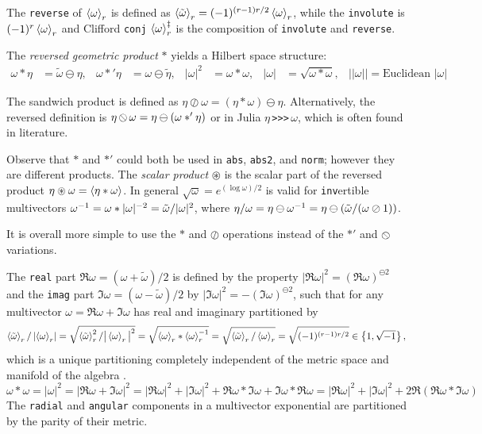 \documentclass{juliacon}
\DeclareMathOperator*{\obackslash}{\text{\reflectbox{$\oslash$}}}
\begin{document}
\begin{definition}
	The \verb`reverse` of $\left\langle \omega \right\rangle_r$ is defined as $\left\langle \tilde\omega \right\rangle_r = (-1)^{(r-1)r/2}\left\langle \omega \right\rangle_r$, while the \verb`involute` is $(-1)^r\left\langle \omega \right\rangle_r$ and Clifford \verb`conj`  $\left\langle \omega \right\rangle_r^\ddagger$ is the composition of \verb`involute` and \verb`reverse`.
\end{definition}

\begin{definition}
	The \textit{reversed geometric product} $\ast$ yields a Hilbert space structure:
	\begin{align*}
		\omega\ast\eta &= \tilde\omega\ominus\eta, & \omega\ast'\eta &= \omega\ominus\tilde\eta, & |\omega|^2 &= \omega\ast\omega, & |\omega| &= \sqrt{\omega\ast\omega}, & ||\omega|| = \text{Euclidean }|\omega|
	\end{align*}
\end{definition}
\begin{definition}
	The sandwich product is defined as $\eta\oslash\omega = (\eta\ast\omega)\ominus\eta$. Alternatively, the reversed definition is $\eta\obackslash\omega = \eta\ominus(\omega\ast'\eta)$ or in Julia $\eta\,$\verb`>>>`$\,\omega$, which is often found in literature.
\end{definition}
\begin{note}
	Observe that $\ast$ and $\ast'$ could both be used in \verb`abs`, \verb`abs2`, and \verb`norm`; however they are different products.
	The \textit{scalar product} $\circledast$ is the scalar part of the reversed product $\eta\circledast\omega = \left\langle \eta\ast\omega \right\rangle$.
	In general $\sqrt\omega = e^{(\log\omega)/2}$ is valid for \verb`inv`ertible multivectors $\omega^{-1} = \omega\ast|\omega|^{-2} = \tilde\omega/|\omega|^2$, where $\eta/\omega = \eta\ominus\omega^{-1} = \eta\ominus(\tilde\omega/(\omega\oslash1))$.
\end{note}
\begin{remark}
	It is overall more simple to use the $\ast$ and $\oslash$ operations instead of the $\ast'$ and $\obackslash$ variations.
\end{remark}
The \verb`real` part $\Re\omega = (\omega+\tilde\omega)/2$ is defined by the property $|\Re\omega|^2 = (\Re\omega)^{\ominus2}$ and the \verb`imag` part $\Im\omega = (\omega-\tilde\omega)/2$ by $|\Im\omega|^2 = -(\Im\omega)^{\ominus2}$, such that for any multivector $\omega = \Re\omega+\Im\omega$ has real and imaginary partitioned by 
$$\left\langle \tilde\omega \right\rangle_r/\left|\left\langle \omega \right\rangle_r\right| = \sqrt{\left\langle \tilde\omega \right\rangle_r^2/\big|\left\langle \omega \right\rangle_r\big|^2} = \sqrt{\left\langle \omega \right\rangle_r\ast\left\langle \omega \right\rangle_r^{-1}} = \sqrt{\left\langle \tilde\omega \right\rangle_r/\left\langle \omega \right\rangle_r}=\sqrt{(-1)^{(r-1)r/2}} \in\left\{ 1,\sqrt{-1} \right\},$$
which is a unique partitioning completely independent of the metric space and manifold of the algebra \cite{chappell-iqbal-gunn-abbott}.
$$ \omega\ast\omega = |\omega|^2 = |\Re\omega+\Im\omega|^2 = |\Re\omega|^2 + |\Im\omega|^2 + \Re\omega\ast\Im\omega + \Im\omega\ast\Re\omega = |\Re\omega|^2+|\Im\omega|^2 + 2\Re(\Re\omega\ast\Im\omega) $$
The \verb`radial` and \verb`angular` components in a multivector exponential are partitioned by the parity of their metric.
\end{document}
